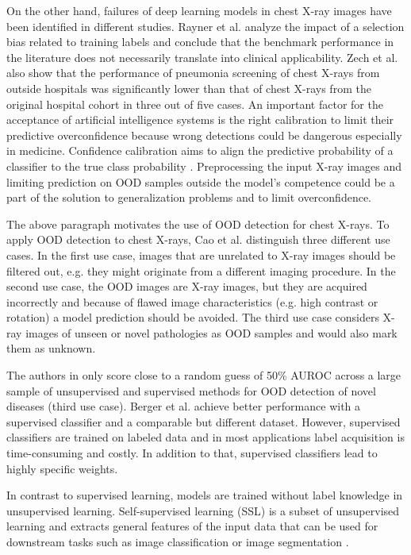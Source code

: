 On the other hand, failures of deep learning models in chest X-ray images have been identified in different studies.
Rayner et al. \citep{Rayner2019} analyze the impact of a selection bias related to training labels and conclude that the benchmark performance in the literature does not necessarily translate into clinical applicability.
Zech et al. \citep{Zech2018} also show that the performance of pneumonia screening of chest X-rays from outside hospitals was significantly lower than that of chest X-rays from the original hospital cohort in three out of five cases.
An important factor for the acceptance of artificial intelligence systems is the right calibration to limit their predictive overconfidence because wrong detections could be dangerous especially in medicine.
Confidence calibration aims to align the predictive probability of a classifier to the true class probability \citep{Guo2017}.
Preprocessing the input X-ray images and limiting prediction on OOD samples outside the model's competence could be a part of the solution to generalization problems and to limit overconfidence.
\par
The above paragraph motivates the use of OOD detection for chest X-rays.
To apply OOD detection to chest X-rays, Cao et al. \citep{Cao2020} distinguish three different use cases.
In the first use case, images that are unrelated to X-ray images should be filtered out, e.g. they might originate from a different imaging procedure.
In the second use case, the OOD images are X-ray images, but they are acquired incorrectly and because of flawed image characteristics (e.g. high contrast or rotation) a model prediction should be avoided.
The third use case considers X-ray images of unseen or novel pathologies as OOD samples and would also mark them as unknown.
\par
The authors in \citep{Cao2020} only score close to a random guess of 50\% AUROC across a large sample of unsupervised and supervised methods for OOD detection of novel diseases (third use case).
Berger et al. \citep{Berger2021} achieve better performance with a supervised classifier and a comparable but different dataset.
However, supervised classifiers are trained on labeled data and in most applications label acquisition is time-consuming and costly.
In addition to that, supervised classifiers lead to highly specific weights.
\par
In contrast to supervised learning, models are trained without label knowledge in unsupervised learning.
Self-supervised learning (SSL) is a subset of unsupervised learning and extracts general features of the input data that can be used for downstream tasks such as image classification or image segmentation \citep{Jing2019}.
